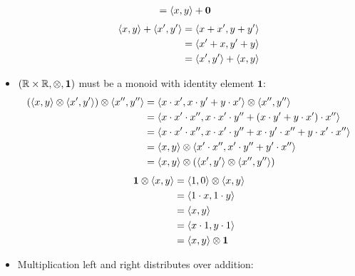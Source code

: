 \documentclass[a4paper,12pt]{ETHexercise}
\begin{document}
\begin{question}
\begin{subquestion}
\begin{itemize}
\begin{align}
				                               & = {\langle x , y \rangle} + \mathbf{0}
			      \end{align}
			      \begin{align}
				      {\langle x , y \rangle} + {\langle x' , y' \rangle} & = {\langle x + x' , y + y' \rangle}       \\
				                                  & = {\langle x' + x , y' + y \rangle}       \\
				                                  & = {\langle x' , y' \rangle} + {\langle x , y \rangle}
			      \end{align}
			\item $(\mathbb{R} \times \mathbb{R}, \otimes, \mathbf{1})$ must be a monoid with identity element $\mathbf{1}$:
			      \begin{align}
				      \left({\langle x , y \rangle} \otimes {\langle x' , y' \rangle} \right) \otimes {\langle x'' , y'' \rangle} & = {\langle x \cdot x' , x \cdot y' + y \cdot x' \rangle} \otimes {\langle x'' , y'' \rangle}                              \\
				                                                                              & = {\langle x \cdot x' \cdot x'' , x \cdot x' \cdot y'' + (x \cdot y' + y \cdot x') \cdot x'' \rangle}         \\
				                                                                              & = {\langle x \cdot x' \cdot x'' , x \cdot x' \cdot y'' + x \cdot y' \cdot x'' + y \cdot x' \cdot x'' \rangle} \\
				                                                                              & = {\langle x , y \rangle} \otimes {\langle x' \cdot x'' , x' \cdot y'' + y' \cdot x'' \rangle}                            \\
				                                                                              & = {\langle x , y \rangle} \otimes \left({\langle x' , y' \rangle} \otimes {\langle x'' , y'' \rangle}\right)
			      \end{align}
			      \begin{align}
				      \mathbf{1} \otimes {\langle x , y \rangle} & = {\langle 1 , 0 \rangle} \otimes {\langle x , y \rangle} \\
				                                     & = {\langle 1 \cdot x , 1 \cdot y \rangle}     \\
				                                     & = {\langle x , y \rangle}                     \\
				                                     & = {\langle x \cdot 1 , y \cdot 1 \rangle}     \\
				                                     & = {\langle x , y \rangle} \otimes \mathbf{1}
			      \end{align}
			\item Multiplication left and right distributes over addition:

\end{itemize}
\end{subquestion}
\end{question}
\end{document}
